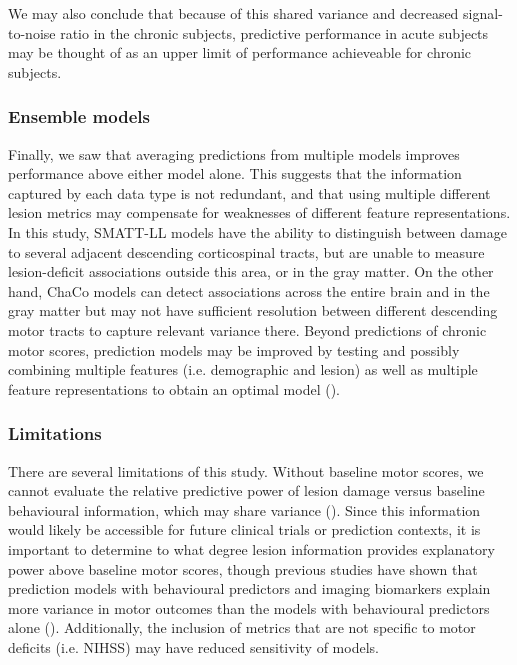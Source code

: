 \documentclass[10pt]{article}
\begin{document}
We may also conclude that because of this shared variance and decreased signal-to-noise ratio in the chronic subjects, predictive performance in acute subjects may be thought of as an upper limit of performance achieveable for chronic subjects. 

\subsubsection*{Ensemble models}
Finally, we saw that averaging predictions from multiple models improves performance above either model alone. This suggests that the information captured by each data type is not redundant, and that using multiple different lesion metrics may compensate for weaknesses of different feature representations. In this study, SMATT-LL models have the ability to distinguish between damage to several adjacent descending corticospinal tracts, but are unable to measure lesion-deficit associations outside this area, or in the gray matter. On the other hand, ChaCo models can detect associations across the entire brain and in the gray matter but may not have sufficient resolution between different descending motor tracts to capture relevant variance there. Beyond predictions of chronic motor scores, prediction models may be improved by testing and possibly combining multiple features (i.e. demographic and lesion) as well as multiple feature representations to obtain an optimal model (\cite{Kasties2021-rm, Park2022-nt}).

\subsubsection*{Limitations}
There are several limitations of this study. Without baseline motor scores, we cannot evaluate the relative predictive power of lesion damage versus baseline behavioural information, which may share variance (\cite{Feng2015-du, Bowren2022-rs}). Since this information would likely be accessible for future clinical trials or prediction contexts, it is important to determine to what degree lesion information provides explanatory power above baseline motor scores, though previous studies have shown that prediction models with behavioural predictors and imaging biomarkers explain more variance in motor outcomes than the models with behavioural predictors alone (\cite{Kim2017-xe, Feng2015-du}). Additionally, the inclusion of metrics that are not specific to motor deficits (i.e. NIHSS) may have reduced sensitivity of models. 
\end{document}
